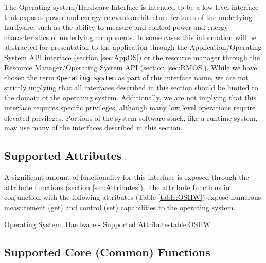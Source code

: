 The Operating system/Hardware Interface is intended to be a low level interface that exposes power and energy relevant architecture features of the underlying hardware, such as the ability to measure and control power and energy characteristics of underlying components. 
In some cases this information will be abstracted for presentation to the application through the Application/Operating System API interface (section \ref{sec:AppOS}) or the resource manager through the Resource Manager/Operating System API (section \ref{sec:RMOS}).
While we have chosen the term \texttt{Operating system} as part of this interface name, we are not strictly implying that all interfaces described in this section should be limited to the domain of the operating system. 
Additionally, we are not implying that this interface requires specific privileges, although many low level operations require elevated privileges. 
Portions of the system software stack, like a runtime system, may use many of the interfaces described in this section.

\subsection{Supported Attributes}\label{sec:OSHWAttributes}
A significant amount of functionality for this interface is exposed through the attribute functions (section \ref{sec:Attributes}).
The attribute functions in conjunction with the following attributes (Table \ref{table:OSHW}) expose numerous measurement  (get) and control (set) capabilities to the operating system.

\begin{attributetable}{Operating System, Hardware - Supported Attributes}{table:OSHW}
\aPstateDesc
\aCstateDesc
\aCstateLimitDesc
\aSstateDesc
\aCurrentDesc
\aVoltageDesc
\aPowerDesc
\aMinPowerDesc
\aMaxPowerDesc
\aFreqDesc
\aFreqLimitMinDesc
\aFreqLimitMaxDesc
\aEnergyDesc
\aTempDesc
\aThrottledIdDesc
\aThrottledCountIdDesc
\aOSIdDesc
\aGovDesc
\end{attributetable}

\subsection{Supported Core (Common) Functions}\label{sec:OSHWSupportedCommon}

